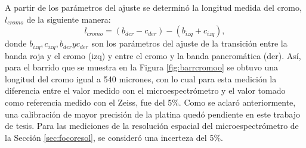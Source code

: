 \begin{figure}[H]
	\begin{floatrow}
	\end{floatrow}
\end{figure}

A partir de los parámetros del ajuste se determinó la longitud medida del cromo, $l_{cromo}$ de la siguiente manera:
\begin{equation}
l_{cromo} = (b_{der} - c_{der}) - (b_{izq} + c_{izq}),
\end{equation}
donde $b_{izq}, c_{izq}, b_{der} yc_{der}$ son los parámetros del ajuste de la transición entre la banda roja y el cromo (izq) y entre el cromo y la banda pancromática (der). Así, para el barrido que se muestra en la Figura \ref{fig:barrcromoo} se obtuvo una longitud del cromo igual a 540 micrones, con lo cual para esta medición la diferencia entre el valor medido con el microespectrómetro y el valor tomado como referencia medido con el Zeiss, fue del 5\%. Como se aclaró anteriormente, una calibración de mayor precisión de la platina quedó pendiente en este trabajo de tesis. Para las mediciones de la resolución espacial del microespectrómetro de la Sección \ref{sec:focoresol}, se consideró una incerteza del 5\%.%


